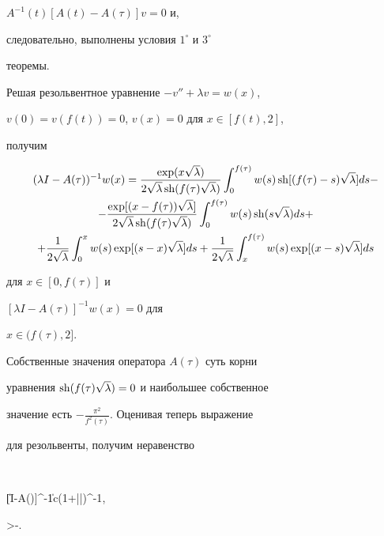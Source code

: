 $A^{-1}(t)[A(t)-A(\tau)]v=0$ и,


следовательно, выполнены условия $1^\circ$ и $3^\circ$


теоремы.





Решая резольвентное уравнение $-v''+\lambda v=w(x)$,


$v(0)=v(f(t))=0$, $v(x)=0$ для $x\in [f(t),2]$,


получим


\begin{multline*}


(\lambda I-A(\tau))^{-1}w(x)=


\frac{\exp(x\sqrt{\lambda})}


{2\sqrt{\lambda}\sh(f(\tau)\sqrt{\lambda})}


\int^{f(\tau)}_0 w(s)\sh[(f(\tau)-s)\sqrt{\lambda}]ds-\\


%


-\frac{\exp[(x-f(\tau))\sqrt{\lambda}]}


{2\sqrt{\lambda}\sh(f(\tau)\sqrt{\lambda})}


\int^{f(\tau)}_0 w(s)\sh(s\sqrt{\lambda})ds+ \\


%


+\frac{1}{2\sqrt{\lambda}}\int^x_0 w(s)


\exp[(s-x)\sqrt{\lambda}]ds+\frac{1}{2\sqrt{\lambda}}


\int^{f(\tau)}_x w(s)\exp[(x-s)\sqrt{\lambda}]ds


\end{multline*}


для $x\in[0,f(\tau)]$ и


$[\lambda I-A(\tau)]^{-1}w(x)=0$ для


$x\in(f(\tau),2]$.





Собственные значения оператора $A(\tau)$ суть корни


уравнения $\operatorname{sh}(f(\tau)\sqrt{\lambda})=0$ и наибольшее собственное


значение есть $-\frac{\pi^2}{f^2(\tau)}$. Оценивая теперь выражение


для резольвенты, получим неравенство


$$


\|[\lambda I-A(\tau)]^{-1}\|\le c(1+|\lambda|)^{-1},\quad


\lambda>-.


